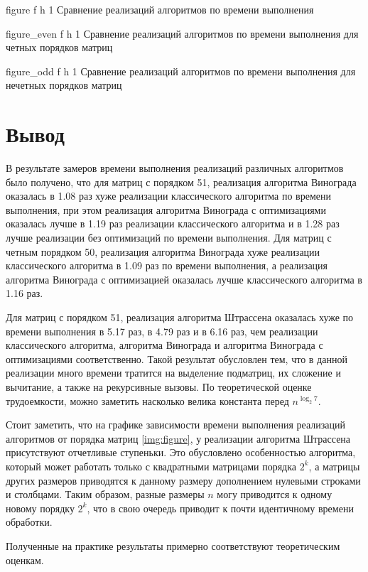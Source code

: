 {figure} %
{f} %
{h} %
{1\textwidth} %
{Сравнение реализаций алгоритмов по времени выполнения} %

{figure_even} %
{f} %
{h} %
{1\textwidth} %
{Сравнение реализаций алгоритмов по времени выполнения для четных порядков матриц} %

{figure_odd} %
{f} %
{h} %
{1\textwidth} %
{Сравнение реализаций алгоритмов по времени выполнения для нечетных порядков матриц} %


\clearpage

\section*{Вывод}

В результате замеров времени выполнения реализаций различных алгоритмов было получено, что для матриц с порядком 51, реализация алгоритма Винограда оказалась в 1.08 раз хуже реализации классического алгоритма по времени выполнения, при этом реализация алгоритма Винограда с оптимизациями оказалась лучше в 1.19 раз реализации классического алгоритма и в 1.28 раз лучше реализации без оптимизаций по времени выполнения. 
Для матриц с четным порядком 50, реализация алгоритма Винограда хуже реализации классического алгоритма в 1.09 раз по времени выполнения, а реализация алгоритма Винограда с оптимизацией оказалась лучше классического алгоритма в 1.16 раз. 

Для матриц с порядком 51, реализация алгоритма Штрассена оказалась хуже по времени выполнения в 5.17 раз, в 4.79 раз и в 6.16 раз, чем реализации классического алгоритма, алгоритма Винограда и алгоритма Винограда с оптимизациями соответственно. 
Такой результат обусловлен тем, что в данной реализации много времени тратится на выделение подматриц, их сложение и вычитание, а также на рекурсивные вызовы. По теоретической оценке трудоемкости, можно заметить насколько велика константа перед $n^{\log_{2}7}$.

Стоит заметить, что на графике зависимости времени выполнения реализаций алгоритмов от порядка матриц \ref{img:figure}, у реализации алгоритма Штрассена присутствуют отчетливые ступеньки.
Это обусловлено особенностью алгоритма, который может работать только с квадратными матрицами порядка $2^k$, а матрицы других размеров приводятся к данному размеру дополнением нулевыми строками и столбцами. 
Таким образом, разные размеры $n$ могу приводится к одному новому порядку $2^k$, что в свою очередь приводит к почти идентичному времени обработки.

Полученные на практике результаты примерно соответствуют теоретическим оценкам.